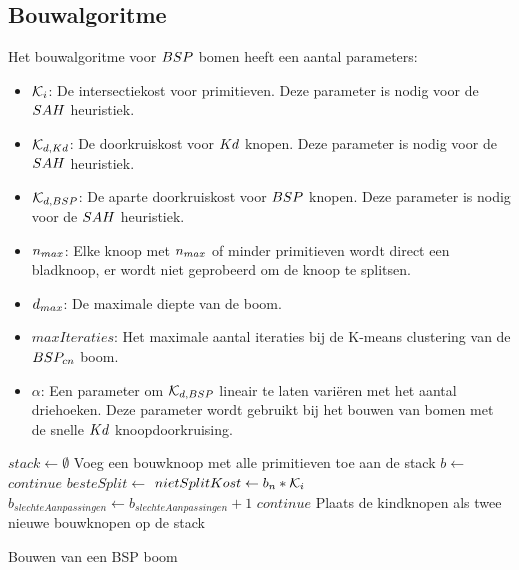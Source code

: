 \subsection{Bouwalgoritme}
Het bouwalgoritme voor $BSP$ bomen heeft een aantal parameters:
\begin{itemize}
    \item $\mathcal{K}_i$: De intersectiekost voor primitieven. Deze parameter is nodig voor de $SAH$ heuristiek.
    \item $\mathcal{K}_{d,Kd}$: De doorkruiskost voor $Kd$ knopen. Deze parameter is nodig voor de $SAH$ heuristiek.
    \item $\mathcal{K}_{d,BSP}$: De aparte doorkruiskost voor $BSP$ knopen. Deze parameter is nodig voor de $SAH$ heuristiek.
    \item $n_{max}$: Elke knoop met $n_{max}$ of minder primitieven wordt direct een bladknoop, er wordt niet geprobeerd om de knoop te splitsen.
    \item $d_{max}$: De maximale diepte van de boom.
    \item $maxIteraties$: Het maximale aantal iteraties bij de K-means clustering van de $BSP_{cn}$ boom.
    \item $\alpha$: Een parameter om $\mathcal{K}_{d,BSP}$ lineair te laten variëren met het aantal driehoeken. Deze parameter wordt gebruikt bij het bouwen van bomen met de snelle $Kd$ knoopdoorkruising.
\end{itemize}
\begin{dutchalgorithm}
    \begin{algorithmic}
        \State $stack\gets \emptyset$
        \State Voeg een bouwknoop met alle primitieven toe aan de stack
            \State $b \gets $
                \State {}
                \State $continue$
            \EndIf
            \State $besteSplit \gets $ 
            \State $nietSplitKost \gets  b_{n}*\mathcal{K}_i$
                \State $b_{slechteAanpassingen} \gets b_{slechteAanpassingen} + 1$
            \EndIf
                \State {}
                \State $continue$
            \EndIf
            \State {}
            \State Plaats de kindknopen als twee nieuwe bouwknopen op de stack
        \EndWhile
    \end{algorithmic}
    \caption{Bouwen van een BSP boom}
    \label{alg:bsp-bouw}
\end{dutchalgorithm}

